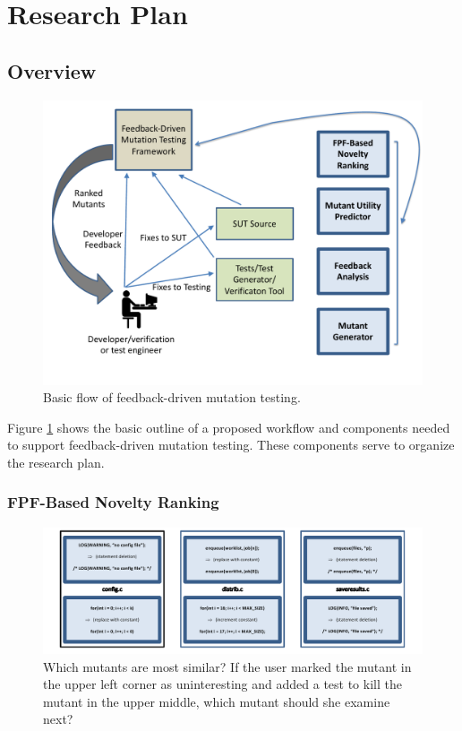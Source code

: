 \section{Research Plan}

\subsection{Overview}

\begin{figure}[t]
\centering
\includegraphics[width=0.8\columnwidth]{TestFlow}

\caption{Basic flow of feedback-driven mutation testing.}
\label{fig:flow}
\end{figure}

Figure \ref{fig:flow} shows the basic outline of a proposed workflow
and components needed to support feedback-driven mutation testing.
These components serve to organize the research plan.


\subsubsection{FPF-Based Novelty Ranking}
\label{sec:fpfplan}

\begin{figure}[t]
\centering
\includegraphics[width=0.95\columnwidth]{distmetric}

\caption{Which mutants are most similar?  If the user marked the
  mutant in the upper left corner as uninteresting and added a test
  to kill the
  mutant in the upper middle, which mutant
  should she examine next?}
\label{fig:distances}
\end{figure}

